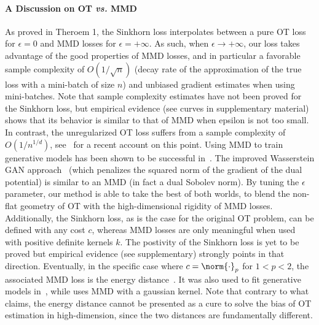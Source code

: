 \paragraph{A Discussion on OT \emph{vs.} MMD}
As proved in Theroem 1, the Sinkhorn loss interpolates between a pure OT loss for $\epsilon=0$ and MMD losses for $\epsilon=+\infty$. 
As such, when $\epsilon \rightarrow +\infty$, our loss takes advantage of the good properties of MMD losses, and in particular a favorable sample complexity of $O(1/\sqrt{n})$ (decay rate of the approximation of the true loss with a mini-batch of size $n$) and unbiased gradient estimates when using mini-batches. Note that sample complexity estimates have not been proved for the Sinkhorn loss, but empirical evidence (see curves in supplementary material) shows that its behavior is similar to that of MMD when epsilon is not too small.  In contrast, the unregularized OT loss suffers from a sample complexity of $O(1/n^{1/d})$, see~\cite{weed2017sharp} for a recent account on this point. 
%
Using MMD to train generative models has been shown to be successful in~\cite{MMD-GAN,li2015generative}. The improved Wasserstein GAN approach~\cite{gulrajani2017improved} (which penalizes the squared norm of the gradient of the dual potential) is similar to an MMD (in fact a dual Sobolev norm).
%
By tuning the $\epsilon$ parameter, our method is able to take the best of both worlds, to blend the non-flat geometry of OT with the high-dimensional rigidity of MMD losses. Additionally, the Sinkhorn loss, as is the case for the original OT problem, can be defined with any cost $c$, whereas MMD losses are only meaningful when used with positive definite kernels $k$. The postivity of the Sinkhorn loss is yet to be proved but empirical evidence (see supplementary) strongly points in that direction.
%
Eventually, in the specific case where $c = \norm{\cdot}_p$ for $1<p<2$, the associated MMD loss is the energy distance~\cite{szekely2004testing}. It was also used to fit generative models in~\cite{CramerGAN}, while \cite{MMDGAN} uses MMD with a gaussian kernel. Note that contrary to what~\cite{CramerGAN} claims, the energy distance cannot be presented as a cure to solve the bias of OT estimation in high-dimension, since the two distances are fundamentally different. 
